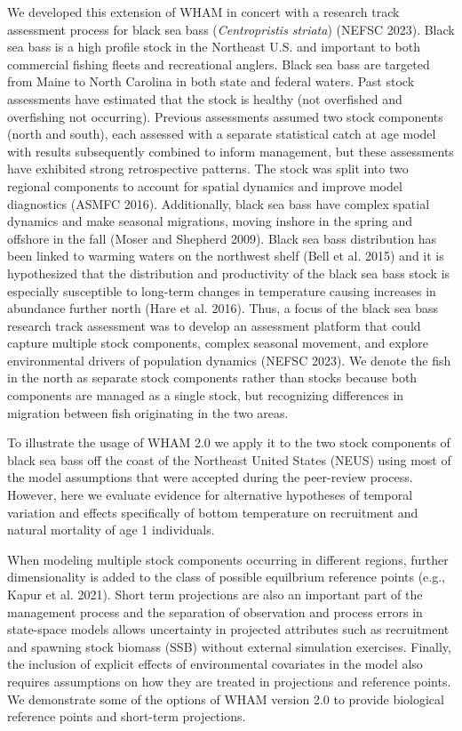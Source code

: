 \documentclass[
]{article}
\begin{document}
We developed this extension of WHAM in concert with a research track assessment process for black sea bass (\textit{Centropristis striata}) (NEFSC 2023). Black sea bass is a high profile stock in the Northeast U.S. and important to both commercial fishing fleets and recreational anglers. Black sea bass are targeted from Maine to North Carolina in both state and federal waters. Past stock assessments have estimated that the stock is healthy (not overfished and overfishing not occurring). Previous assessments assumed two stock components (north and south), each assessed with a separate statistical catch at age model with results subsequently combined to inform management, but these assessments have exhibited strong retrospective patterns. The stock was split into two regional components to account for spatial dynamics and improve model diagnostics (ASMFC 2016). Additionally, black sea bass have complex spatial dynamics and make seasonal migrations, moving inshore in the spring and offshore in the fall (Moser and Shepherd 2009). Black sea bass distribution has been linked to warming waters on the northwest shelf (Bell et al. 2015) and it is hypothesized that the distribution and productivity of the black sea bass stock is especially susceptible to long-term changes in temperature causing increases in abundance further north (Hare et al. 2016). Thus, a focus of the black sea bass research track assessment was to develop an assessment platform that could capture multiple stock components, complex seasonal movement, and explore environmental drivers of population dynamics (NEFSC 2023). We denote the fish in the north as separate stock components rather than stocks because both components are managed as a single stock, but recognizing differences in migration between fish originating in the two areas.

To illustrate the usage of WHAM 2.0 we apply it to the two stock components of black sea bass off the coast of the Northeast United States (NEUS) using most of the model assumptions that were accepted during the peer-review process. However, here we evaluate evidence for alternative hypotheses of temporal variation and effects specifically of bottom temperature on recruitment and natural mortality of age 1 individuals.

When modeling multiple stock components occurring in different regions, further dimensionality is added to the class of possible equilbrium reference points (e.g., Kapur et al. 2021). Short term projections are also an important part of the management process and the separation of observation and process errors in state-space models allows uncertainty in projected attributes such as recruitment and spawning stock biomass (SSB) without external simulation exercises. Finally, the inclusion of explicit effects of environmental covariates in the model also requires assumptions on how they are treated in projections and reference points. We demonstrate some of the options of WHAM version 2.0 to provide biological reference points and short-term projections.
\end{document}

